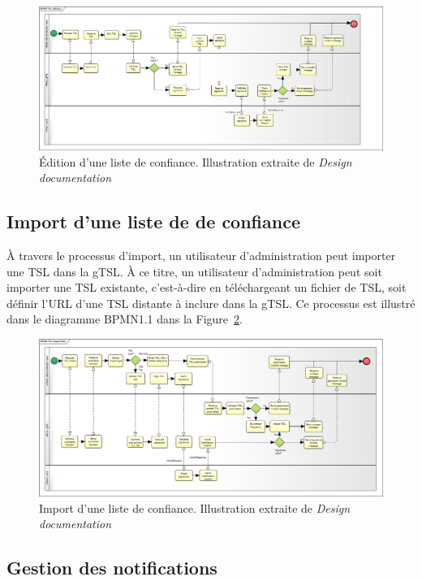 \documentclass{tnreport}
\begin{document}
\begin{figure}[h]
	\centering
	\includegraphics[scale=0.3]{figures/edit-flow}
	\caption{Édition d'une liste de confiance. Illustration extraite de \textit{Design documentation}~\cite{design-document}}
	\label{fig:edit-flow}
\end{figure}

\subsection{Import d'une liste de de confiance}

À travers le processus d'import, un utilisateur d'administration peut importer une TSL dans la gTSL. À ce titre, un utilisateur d'administration peut soit importer une TSL existante, c'est-à-dire en téléchargeant un fichier de TSL, soit définir l'URL d'une TSL distante à inclure dans la gTSL. Ce processus est illustré dans le diagramme BPMN1.1 dans la Figure~\ref{fig:import-flow}.

\begin{figure}[h]
	\centering
	\includegraphics[scale=0.31]{figures/import-flow}
	\caption{Import d'une liste de confiance. Illustration extraite de \textit{Design documentation}~\cite{design-document}}
	\label{fig:import-flow}
\end{figure}

\subsection{Gestion des notifications}
\end{document}
